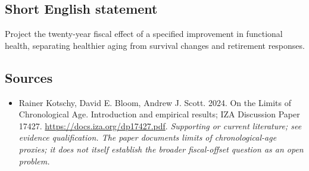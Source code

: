 \documentclass[11pt]{article}
\begin{document}
\subsection{Short English statement}
Project the twenty-year fiscal effect of a specified improvement in functional health, separating healthier aging from survival changes and retirement responses.

\subsection{Sources}
\begin{itemize}\raggedright
\item[\textnormal{[S1]}]\hypertarget{source:30007741:1}{} Rainer Kotschy, David E. Bloom, Andrew J. Scott. 2024. On the Limits of Chronological Age. Introduction and empirical results; IZA Discussion Paper 17427.
\url{https://docs.iza.org/dp17427.pdf}.
{\small\textit{Supporting or current literature; see evidence qualification. The paper documents limits of chronological-age proxies; it does not itself establish the broader fiscal-offset question as an open problem.}}
\end{itemize}
\end{document}
